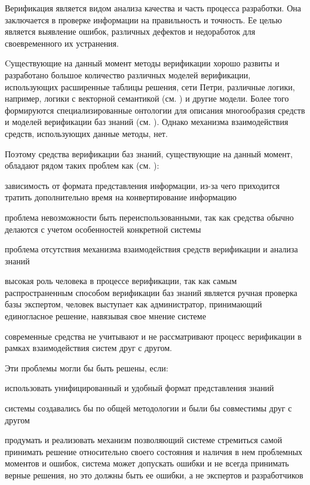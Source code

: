 Верификация является видом анализа качества и часть процесса разработки. Она заключается в проверке информации на правильность и точность.
Ее целью является выявление ошибок, различных дефектов и недоработок для своевременного их устранения.

Cуществующие на данный момент методы верификации хорошо развиты и разработано большое количество различных моделей верификации, использующих расширенные таблицы решения, сети Петри, различные логики, например, логики с векторной семантикой (см. ) и другие модели. Более того формируются специализированные онтологии для описания многообразия средств и моделей верификации баз знаний (см. ). Однако механизма взаимодействия средств, использующих данные методы, нет.

Поэтому средства верификации баз знаний, существующие на данный момент, обладают рядом таких проблем как (см. ):
\begin{textitemize}
    \item зависимость от формата представления информации, из-за чего приходится тратить дополнительно время на конвертирование информацию
    \item проблема невозможности быть переиспользованными, так как средства обычно делаются с учетом особенностей конкретной системы
    \item проблема отсутствия механизма взаимодействия средств верификации и анализа знаний
    \item высокая роль человека в процессе верификации, так как самым распространенным способом верификации баз знаний является ручная проверка базы экспертом, человек выступает как администратор, принимающий единогласное решение, навязывая свое мнение системе
    \item современные средства не учитывают и не рассматривают процесс верификации в рамках взаимодействия систем друг с другом.
\end{textitemize}

Эти проблемы могли бы быть решены, если:
\begin{textitemize}
    \item использовать унифицированный и удобный формат представления знаний
    \item системы создавались бы по общей методологии и были бы совместимы друг с другом
    \item продумать и реализовать механизм позволяющий системе стремиться самой принимать решение относительно своего состояния и наличия в нем проблемных моментов и ошибок, система может допускать ошибки и не всегда принимать верные решения, но это должны быть ее ошибки, а не экспертов и разработчиков
\end{textitemize}

